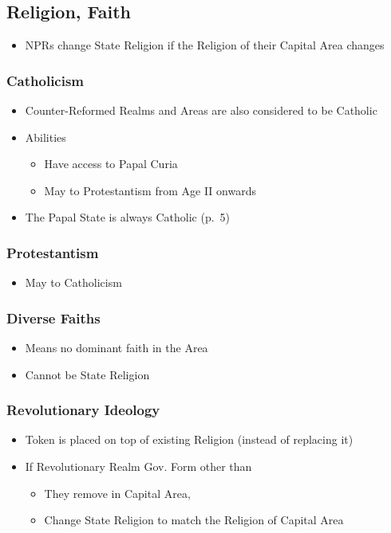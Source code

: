 \documentclass[10pt]{article}
\begin{document}
\subsection*{Religion, Faith }
\begin{itemize}
	\item NPRs change State Religion if the Religion of their Capital Area changes
\end{itemize}

\subsubsection*{Catholicism}
\begin{itemize}
	\item Counter-Reformed Realms and Areas are also considered to be Catholic
	\item Abilities
	\begin{itemize}
		\item Have access to Papal Curia
		\item May  to Protestantism from Age II onwards
	\end{itemize}
	\item The Papal State is always Catholic (p.~5)
\end{itemize}

\subsubsection*{Protestantism}
\begin{itemize}
	\item May  to Catholicism
\end{itemize}

\subsubsection*{Diverse Faiths}
\begin{itemize}
	\item Means no dominant faith in the Area
	\item Cannot be State Religion
\end{itemize}

\subsubsection*{Revolutionary Ideology}
\begin{itemize}
	\item Token is placed on top of existing Religion (instead of replacing it)
	\item If Revolutionary Realm  Gov. Form other than 
	\begin{itemize}
		\item They remove \revolution in Capital Area, 
		\item Change State Religion to match the Religion of Capital Area
	\end{itemize}
\end{itemize}
\end{document}

